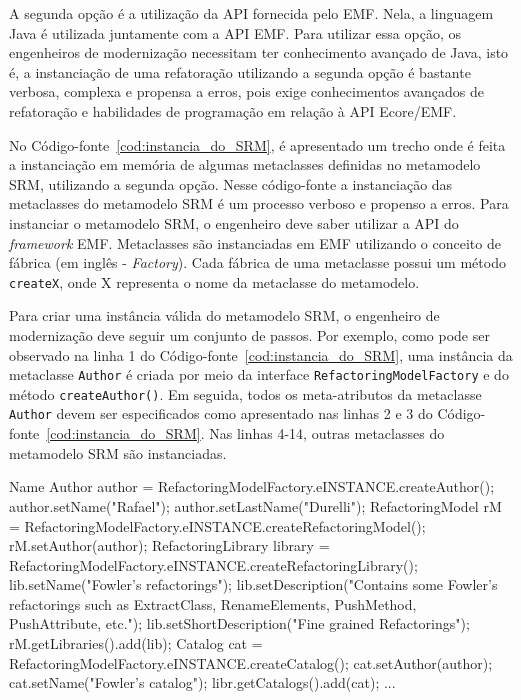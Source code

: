A segunda opção é a utilização da API fornecida pelo EMF. Nela, a linguagem Java é utilizada juntamente com a API EMF. Para utilizar essa opção, os engenheiros de modernização necessitam ter conhecimento avançado de Java, isto é, a instanciação de uma refatoração utilizando a segunda opção é bastante verbosa, complexa e propensa a erros, pois exige conhecimentos avançados de refatoração e habilidades de programação em relação à API Ecore/EMF. 

No Código-fonte~\ref{cod:instancia_do_SRM}, é apresentado um trecho onde é feita a instanciação em memória de algumas metaclasses definidas no metamodelo SRM, utilizando a segunda opção. Nesse código-fonte a instanciação das metaclasses do metamodelo SRM é um processo verboso e propenso a erros. Para instanciar o metamodelo SRM, o engenheiro deve saber utilizar a API do \textit{framework} EMF. Metaclasses são instanciadas em EMF utilizando o conceito de fábrica (em inglês - \textit{Factory}). Cada fábrica de uma metaclasse possui um método \texttt{createX}, onde X representa o nome da metaclasse do metamodelo. 

Para criar uma instância válida do metamodelo SRM, o engenheiro de modernização deve seguir um conjunto de passos. Por exemplo, como pode ser observado na linha 1 do Código-fonte~\ref{cod:instancia_do_SRM}, uma instância da metaclasse \texttt{Author} é criada por meio da interface \texttt{RefactoringModelFactory} e do método \texttt{createAuthor()}. Em seguida, todos os meta-atributos da metaclasse \texttt{Author} devem ser especificados como apresentado nas linhas 2 e 3 do Código-fonte~\ref{cod:instancia_do_SRM}. Nas linhas 4-14, outras metaclasses do metamodelo SRM são instanciadas. 

\begin{codigo}[caption={[Instanciação do metamodelo SRM programaticamente.] Instanciação do metamodelo SRM.},escapeinside={(*@}{@*)}, basicstyle=\footnotesize, label={cod:instancia_do_SRM}, language=Java]{Name}
Author author = RefactoringModelFactory.eINSTANCE.createAuthor();
author.setName("Rafael");
author.setLastName("Durelli");
RefactoringModel rM = RefactoringModelFactory.eINSTANCE.createRefactoringModel();
rM.setAuthor(author);
RefactoringLibrary library = RefactoringModelFactory.eINSTANCE.createRefactoringLibrary();
lib.setName("Fowler's refactorings");
lib.setDescription("Contains some Fowler's refactorings such as ExtractClass, RenameElements, PushMethod, PushAttribute, etc.");
lib.setShortDescription("Fine grained Refactorings");
rM.getLibraries().add(lib);
Catalog cat = RefactoringModelFactory.eINSTANCE.createCatalog();
cat.setAuthor(author);
cat.setName("Fowler's catalog");
libr.getCatalogs().add(cat);
...
\end{codigo}


